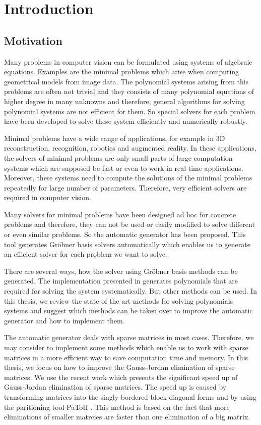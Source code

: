 \chapter{Introduction}
\section{Motivation}
Many problems in computer vision can be formulated using systems of algebraic equations. Examples are the minimal problems \cite{MinimalProblems} which arise when computing geometrical models from image data. The polynomial systems arising from this problems are often not trivial and they consists of many polynomial equations of higher degree in many unknowns and therefore, general algorithms for solving polynomial systems are not efficient for them. So special solvers for each problem have been developed to solve these system efficiently and numerically robustly.

Minimal problems have a wide range of applications, for example in 3D reconstruction, recognition, robotics and augmented reality. In these applications, the solvers of minimal problems are only small parts of large computation systems which are supposed be fast or even to work in real-time applications. Moreover, these systems need to compute the solutions of the minimal problems repeatedly for large number of parameters. Therefore, very efficient solvers are required in computer vision.

Many solvers for minimal problems have been designed ad hoc for concrete problems and therefore, they can not be used or easily modified to solve different or even similar problems. So the automatic generator \cite{AutoGen} has been proposed. This tool generates Gr\"obner basis solvers automatically which enables us to generate an efficient solver for each problem we want to solve.

There are several ways, how the solver using Gr\"obner basis methods can be generated. The implementation presented in \cite{AutoGen} generates polynomials that are required for solving the system systematically. But other methods can be used. In this thesis, we review the state of the art methods for solving polynomials systems and suggest which methods can be taken over to improve the automatic generator and how to implement them.

The automatic generator deals with sparse matrices in most cases. Therefore, we may consider to implement some methods which enable us to work with sparse matrices in a more efficient way to save computation time and memory. In this thesis, we focus on how to improve the Gauss-Jordan elimination of sparse matrices. We use the recent work \cite{SBBD} which presents the significant speed up of Gauss-Jordan elimination of sparse matrices. The speed up is caused by transforming matrices into the singly-bordered block-diagonal forms and by using the paritioning tool PaToH \cite{PaToH}. This method is based on the fact that more eliminations of smaller matrcies are faster than one elimination of a big matrix.

